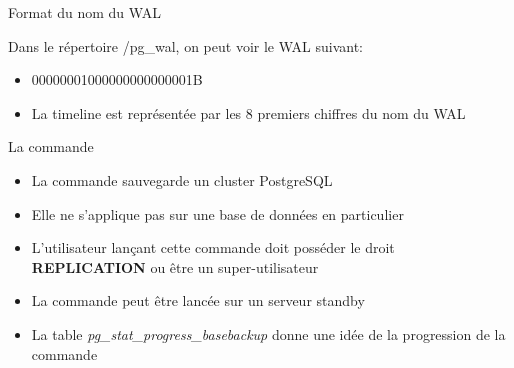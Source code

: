 
\begin{frame}[fragile]{Format du nom du WAL}

   Dans le répertoire /pg\_wal, on peut voir le WAL suivant:

\begin{itemize}

   \item 00000001000000000000001B
   \item La timeline est représentée par les 8 premiers chiffres du nom du WAL

\end{itemize}

\begin{toile}
\end{toile}

\end{frame}



\begin{frame}[fragile]{La commande }

\begin{itemize}

\item La commande  sauvegarde un cluster PostgreSQL
\item Elle ne s'applique pas sur une base de données en particulier
\item L'utilisateur lançant cette commande doit posséder le droit \textbf{REPLICATION} ou être un super-utilisateur
\item La commande peut être lancée sur un serveur standby
\item La table \textit{pg\_stat\_progress\_basebackup} donne une idée de la progression de la commande

\end{itemize}

\begin{toile}
\end{toile}

\end{frame}

